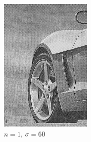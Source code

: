 \documentclass[
	12pt, %
]{style/fphw}
\begin{document}
\begin{figure}[H]
\begin{subfigure}[b]{.22\textwidth}
             \includegraphics[width=\textwidth]{Q5_3_2_60.png}
             \caption{$n=1$, $\sigma=60$}
             \label{Q5_3_1_60}
         \end{subfigure}
         \hfill
         \begin{subfigure}[b]{.22\textwidth}
             \centering

\end{subfigure}
\end{figure}
\end{document}
